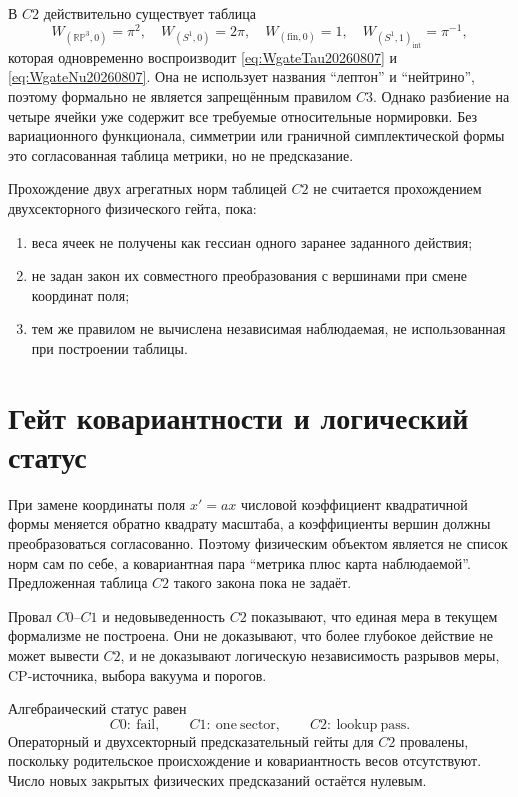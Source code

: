 В \(C2\) действительно существует таблица
\begin{equation}
 W_{(\mathbb{RP}^3,0)}=\pi^2,
 \quad
 W_{(S^1,0)}=2\pi,
 \quad
 W_{(\mathrm{fin},0)}=1,
 \quad
 W_{(S^1,1)_{\mathrm{int}}}=\pi^{-1},
\end{equation}
которая одновременно воспроизводит \eqref{eq:WgateTau20260807} и
\eqref{eq:WgateNu20260807}.
Она не использует названия ``лептон'' и ``нейтрино'', поэтому формально не
является запрещённым правилом \(C3\). Однако разбиение на четыре ячейки уже
содержит все требуемые относительные нормировки. Без вариационного
функционала, симметрии или граничной симплектической формы это согласованная
таблица метрики, но не предсказание.

\begin{nogocriterion}
Прохождение двух агрегатных норм таблицей \(C2\) не считается прохождением
двухсекторного физического гейта, пока:
\begin{enumerate}
 \item веса ячеек не получены как гессиан одного заранее заданного действия;
 \item не задан закон их совместного преобразования с вершинами при смене
 координат поля;
 \item тем же правилом не вычислена независимая наблюдаемая, не
 использованная при построении таблицы.
\end{enumerate}
\end{nogocriterion}

\section{Гейт ковариантности и логический статус}

При замене координаты поля \(x'=a x\) числовой коэффициент квадратичной
формы меняется обратно квадрату масштаба, а коэффициенты вершин должны
преобразоваться согласованно. Поэтому физическим объектом является не
список норм сам по себе, а ковариантная пара ``метрика плюс карта
наблюдаемой''. Предложенная таблица \(C2\) такого закона пока не задаёт.

Провал \(C0\)--\(C1\) и недовыведенность \(C2\) показывают, что единая мера
в текущем формализме не построена. Они не доказывают, что более глубокое
действие не может вывести \(C2\), и не доказывают логическую независимость
разрывов меры, CP-источника, выбора вакуума и порогов.

\begin{proposition}
Алгебраический статус равен
\begin{equation}
 C0:\ \mathrm{fail},
 \qquad
 C1:\ \mathrm{one\ sector},
 \qquad
 C2:\ \mathrm{lookup\ pass}.
\end{equation}
Операторный и двухсекторный предсказательный гейты для \(C2\) провалены,
поскольку родительское происхождение и ковариантность весов отсутствуют.
Число новых закрытых физических предсказаний остаётся нулевым.
\end{proposition}

